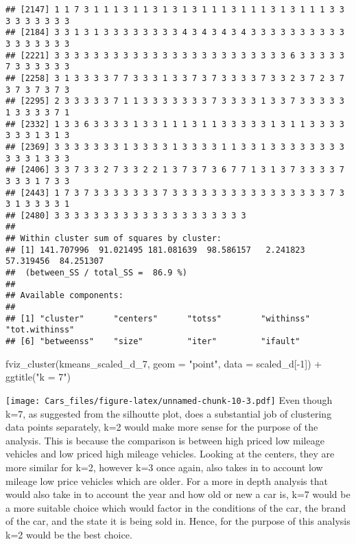 \documentclass[
]{article}
\newenvironment{Shaded}{\begin{snugshade}}{\end{snugshade}}
\newcommand{\AttributeTok}[1]{\textcolor[rgb]{0.77,0.63,0.00}{#1}}
\newcommand{\DecValTok}[1]{\textcolor[rgb]{0.00,0.00,0.81}{#1}}
\newcommand{\FunctionTok}[1]{\textcolor[rgb]{0.00,0.00,0.00}{#1}}
\newcommand{\NormalTok}[1]{#1}
\newcommand{\SpecialCharTok}[1]{\textcolor[rgb]{0.00,0.00,0.00}{#1}}
\newcommand{\StringTok}[1]{\textcolor[rgb]{0.31,0.60,0.02}{#1}}
\begin{document}
\begin{verbatim}
## [2147] 1 1 7 3 1 1 1 3 1 1 3 1 3 1 3 1 1 1 3 1 1 1 3 1 3 1 1 1 3 3 3 3 3 3 3 3 3
## [2184] 3 3 1 3 1 3 3 3 3 3 3 3 3 4 3 4 3 4 3 4 3 3 3 3 3 3 3 3 3 3 3 3 3 3 3 3 3
## [2221] 3 3 3 3 3 3 3 3 3 3 3 3 3 3 3 3 3 3 3 3 3 3 3 3 6 3 3 3 3 3 7 3 3 3 3 3 3
## [2258] 3 1 3 3 3 3 7 7 3 3 3 1 3 3 7 3 7 3 3 3 3 7 3 3 2 3 7 2 3 7 3 7 3 7 3 7 3
## [2295] 2 3 3 3 3 3 7 1 1 3 3 3 3 3 3 3 7 3 3 3 3 1 3 3 7 3 3 3 3 3 1 3 3 3 3 7 1
## [2332] 1 3 3 6 3 3 3 3 1 3 3 1 1 1 3 1 1 3 3 3 3 3 1 3 1 1 3 3 3 3 3 3 3 1 3 1 3
## [2369] 3 3 3 3 3 3 3 1 3 3 3 3 1 3 3 3 3 1 1 3 3 1 3 3 3 3 3 3 3 3 3 3 3 1 3 3 3
## [2406] 3 3 7 3 3 2 7 3 3 2 2 1 3 7 3 7 3 6 7 7 1 3 1 3 7 3 3 3 3 7 3 3 3 1 7 3 3
## [2443] 1 7 3 7 3 3 3 3 3 3 3 7 3 3 3 3 3 3 3 3 3 3 3 3 3 3 3 3 7 3 3 1 3 3 3 3 1
## [2480] 3 3 3 3 3 3 3 3 3 3 3 3 3 3 3 3 3 3 3 3
## 
## Within cluster sum of squares by cluster:
## [1] 141.707996  91.021495 181.081639  98.586157   2.241823  57.319456  84.251307
##  (between_SS / total_SS =  86.9 %)
## 
## Available components:
## 
## [1] "cluster"      "centers"      "totss"        "withinss"     "tot.withinss"
## [6] "betweenss"    "size"         "iter"         "ifault"
\end{verbatim}

\begin{Shaded}
\begin{Highlighting}[]
\FunctionTok{fviz\_cluster}\NormalTok{(kmeans\_scaled\_d\_7, }\AttributeTok{geom =} \StringTok{"point"}\NormalTok{, }\AttributeTok{data =}\NormalTok{ scaled\_d[}\SpecialCharTok{{-}}\DecValTok{1}\NormalTok{]) }\SpecialCharTok{+} \FunctionTok{ggtitle}\NormalTok{(}\StringTok{"k = 7"}\NormalTok{)}
\end{Highlighting}
\end{Shaded}

\texttt{[image: Cars\_files/figure-latex/unnamed-chunk-10-3.pdf]} Even
though k=7, as suggested from the silhoutte plot, does a substantial job
of clustering data points separately, k=2 would make more sense for the
purpose of the analysis. This is because the comparison is between high
priced low mileage vehicles and low priced high mileage vehicles.
Looking at the centers, they are more similar for k=2, however k=3 once
again, also takes in to account low mileage low price vehicles which are
older. For a more in depth analysis that would also take in to account
the year and how old or new a car is, k=7 would be a more suitable
choice which would factor in the conditions of the car, the brand of the
car, and the state it is being sold in. Hence, for the purpose of this
analysis k=2 would be the best choice.
\end{document}
